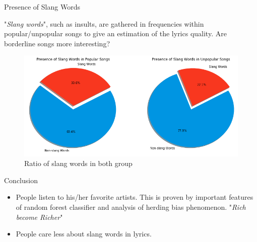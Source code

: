 \documentclass[final]{beamer}
\newlength{\onecolwid}
\begin{document}
\begin{frame}
\begin{columns}[t]
\begin{column}{\onecolwid}
\vspace{-20mm}
\begin{exampleblock}{Presence of Slang Words}

"\textit{Slang words}", such as insults, are gathered in frequencies within popular/unpopular songs to give an estimation of the lyrics quality. Are borderline songs more interesting?

\begin{figure}
\includegraphics[width=0.8\linewidth]{img/Q3_1.png}
\caption{Ratio of slang words in both group}
\end{figure}
\end{exampleblock}

\vspace{-20mm}
\begin{exampleblock}{Conclusion}
\begin{itemize}
\item People listen to his/her favorite artists. This is proven by important features of random forest classifier and analysis of herding bias phenomenon. "\textit{Rich become Richer}"
\item People care less about slang words in lyrics.
\end{itemize}
\end{exampleblock}





\end{column}
\end{columns}
\end{frame}
\end{document}
